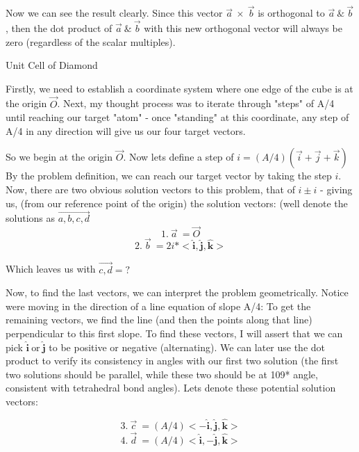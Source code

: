 \documentclass[12pt,letterpaper, onecolumn]{exam}
\begin{document}
\begin{questions}
\begin{solution}
    Now we can see the result clearly. Since this vector $\vec{a}\ \times\ \vec{b}$ is orthogonal to $\vec{a}\ \&\ \vec{b}$, then the dot product of $\vec{a}\ \&\ \vec{b}$ with this new orthogonal vector will always be zero (regardless of the scalar multiples). 
\end{solution}  


    \question[Part A/B] Unit Cell of Diamond\droppoints
    \begin{solution}
        Firstly, we need to establish a coordinate system where one edge of the cube is at the origin $\vec{O}$. Next, my thought process was to iterate through "steps" of A/4 until reaching our target "atom" - once "standing" at this coordinate, any step of A/4 in any direction will give us our four target vectors.

        So we begin at the origin $\vec{O}$. Now lets define a step of $i=(A/4)(\vec{i}+\vec{j}+\vec{k})$ By the problem definition, we can reach our target vector by taking the step $i$. Now, there are two obvious solution vectors to this problem, that of $i\pm{i}$ - giving us, (from our reference point of the origin) the solution vectors: (well denote the solutions as $\vec{a,b,c,d}$
        \begin{equation}
            1.\ \vec{a}\ =\vec{O}
        \end{equation}
        \begin{equation}
            2.\ \vec{b}\ =2i*<\hat{\textbf{i}},\hat{\textbf{j}},\hat{\textbf{k}}>
        \end{equation}

        Which leaves us with $\vec{c,d} = ?$

        Now, to find the last vectors, we can interpret the problem geometrically. Notice were moving in the direction of a line equation of slope A/4: To get the remaining vectors, we find the line (and then the points along that line) perpendicular to this first slope. To find these vectors, I will assert that we can pick $ \hat{\textbf{i}}\ \text{or}\ \hat{\textbf{j}}$ to be positive or negative (alternating). We can later use the dot product to verify its consistency in angles with our first two solution (the first two solutions should be parallel, while these two should be at 109* angle, consistent with tetrahedral bond angles). Lets denote these potential solution vectors:

    
        \begin{equation}
            3.\ \vec{c}\ =(A/4)<-\hat{\textbf{i}},\hat{\textbf{j}},\hat{\textbf{k}}>
        \end{equation}
        \begin{equation}
            4.\ \vec{d}\ =(A/4)<\hat{\textbf{i}},-\hat{\textbf{j}},\hat{\textbf{k}}>
        \end{equation}


\end{solution}
\end{questions}
\end{document}
